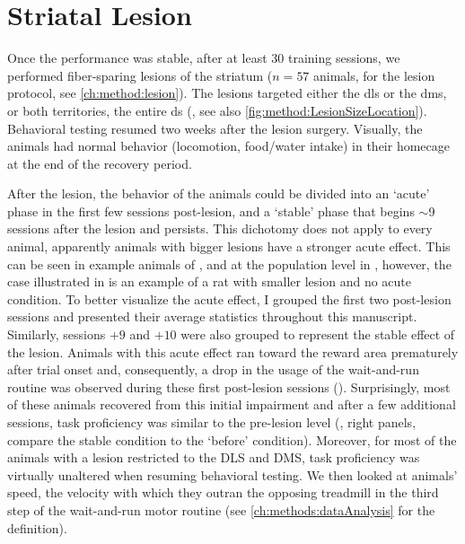 \section{Striatal Lesion}
\label{ch:lesion:lesion}

\par
Once the performance was stable, after at least 30 training sessions, we performed fiber-sparing lesions of the striatum ($n=57$ animals, for the lesion protocol, see \autoref{ch:method:lesion}).
The lesions targeted either the \gls{dls} or the \gls{dms}, or both territories, the entire \gls{ds} (, see also \autoref{fig:method:LesionSizeLocation}).
Behavioral testing resumed two weeks after the lesion surgery.
Visually, the animals had normal behavior (locomotion, food/water intake) in their homecage at the end of the recovery period.
\par
After the lesion, the behavior of the animals could be divided into an `acute' phase in the first few sessions post-lesion, and a `stable' phase that begins $\sim$9 sessions after the lesion and persists.
This dichotomy does not apply to every animal, apparently animals with bigger lesions have a stronger acute effect.
This can be seen in example animals of , and at the population level in , however, the case illustrated in  is an example of a rat with smaller lesion and no acute condition.
To better visualize the acute effect, I grouped the first two post-lesion sessions and presented their average statistics throughout this manuscript.
Similarly, sessions $+9$ and $+10$ were also grouped to represent the stable effect of the lesion.
Animals with this acute effect ran toward the reward area prematurely after trial onset and, consequently, a drop in the usage of the wait-and-run routine was observed during these first post-lesion sessions ().
Surprisingly, most of these animals recovered from this initial impairment and after a few additional sessions, task proficiency was similar to the pre-lesion level (, right panels, compare the stable condition to the `before' condition).
Moreover, for most of the animals with a lesion restricted to the DLS and DMS, task proficiency was virtually unaltered when resuming behavioral testing.
We then looked at animals' speed, the velocity with which they outran the opposing treadmill in the third step of the wait-and-run motor routine (see \autoref{ch:methods:dataAnalysis} for the definition).
